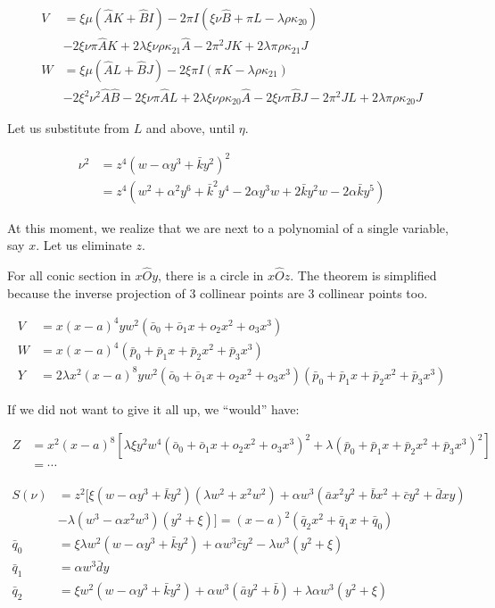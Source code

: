 \documentclass[12pt]{article}
\numberwithin{table}{section}
\begin{document}
\begin{align}
V &= \xi \mu(\hat AK  + \hat BI )-2\pi I(\xi \nu \hat B + \pi L - \lambda \rho \kappa_{20}) \nonumber\\
& -2\xi \nu \pi \hat A K +2 \lambda \xi \nu \rho \kappa_{21} \hat A -2  \pi^2 J K +2 \lambda \pi \rho \kappa_{21} J\\
W &= \xi \mu(\hat AL + \hat BJ) -2\xi \pi I(\pi K - \lambda \rho \kappa_{21})\nonumber\\
&-2\xi^2 \nu^2 \hat A \hat B -2 \xi \nu \pi \hat A L +2 \lambda \xi \nu \rho \kappa_{20} \hat A-2 \xi \nu \pi \hat B J -2 \pi^2 J L +2 \lambda \pi \rho \kappa_{20} J
\end{align}

Let us substitute from $L$ and above, until $\eta$.

\begin{align}
\nu^2 &= z^4 ( w - \alpha y^3 + \bar k y^2)^2\nonumber \\
&= z^4 (w^2 + \alpha^2 y^6 + \bar k^2 y^4 - 2  \alpha y^3 w + 2 \bar k y^2 w - 2 \alpha \bar k y^5)
\end{align}

At this moment, we realize that we are next to a polynomial of a single variable, say $x$. Let us eliminate $z$.

For all conic section in $x\hat O y$, there is a circle in $x\hat O z$. The theorem is simplified because the inverse projection of 3 collinear points are 3 collinear points too.

\begin{align}
V &= x(x-a)^4 yw^2(\bar o_0 + \bar o_1 x + o_2 x^2 + o_3 x^3) \\
W &= x(x-a)^4(\bar p_0 + \bar p_1 x + \bar p_2 x^2 + \bar p_3 x^3)\\
Y &= 2\lambda x^2(x-a)^8 yw^2(\bar o_0 + \bar o_1 x + o_2 x^2 + o_3 x^3)(\bar p_0 + \bar p_1 x + \bar p_2 x^2 + \bar p_3 x^3)
\end{align}

If we did not want to give it all up, we ``would'' have:

\begin{align}
Z &= x^2(x-a)^8 [\lambda\xi  y^2w^4(\bar o_0 + \bar o_1 x + o_2 x^2 + o_3 x^3)^2 + \lambda (\bar p_0 + \bar p_1 x + \bar p_2 x^2 + \bar p_3 x^3)^2] \nonumber\\
&= \cdots
\end{align}

\begin{align}
S(\nu)&=z^2\biggl[\xi (w - \alpha y^3 + \bar k y^2) (\lambda w^2 + x^2 w^2) + \alpha w^3 (\bar a x^2 y^2 + \bar b x^2 + \bar c y^2 + \bar d xy) \nonumber\\
&- \lambda (w^3 - \alpha x^2 w^3) (y^2 + \xi)\biggr]= (x-a)^2(\bar q_2 x^2 + \bar q_1 x + \bar q_0)\\
\bar q_0 &= \xi \lambda w^2(w - \alpha y^3 + \bar k y^2)  + \alpha w^3 \bar c y^2 - \lambda w^3 (y^2 + \xi)\\
\bar q_1 &= \alpha w^3 \bar d y\\
\bar q_2 &= \xi w^2 (w - \alpha y^3 + \bar k y^2) + \alpha w^3 (\bar a y^2 + \bar b) + \lambda \alpha w^3 (y^2 + \xi)
\end{align}
\end{document}
